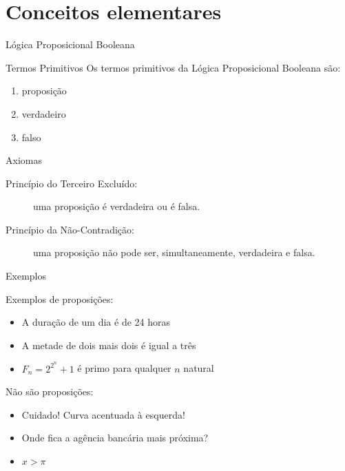 \section{Conceitos elementares}

\begin{frame}[fragile]{Lógica Proposicional Booleana}

    \begin{block}{Termos Primitivos}
        Os termos primitivos da Lógica Proposicional Booleana são: 
        \begin{enumerate}
            \item proposição
            \item verdadeiro
            \item falso
        \end{enumerate}
    \end{block}

    \begin{block}{Axiomas}
       \begin{description}
            \item[Princípio do Terceiro Excluído:] uma proposição é verdadeira ou é falsa.
            \item[Princípio da Não-Contradição:] uma proposição não pode ser, simultaneamente, verdadeira e falsa.
        \end{description}
    \end{block}

\end{frame}

\begin{frame}[fragile]{Exemplos}

    Exemplos de proposições:

    \begin{itemize}
        \item A duração de um dia é de 24 horas
        \item A metade de dois mais dois é igual a três
        \item $F_n = 2^{2^n} + 1$ é primo para qualquer $n$ natural
    \end{itemize}

    \vspace{0.3in}

    Não são proposições:

    \begin{itemize}
        \item Cuidado! Curva acentuada à esquerda!
        \item Onde fica a agência bancária mais próxima?
        \item $x > \pi$
    \end{itemize}

\end{frame}

